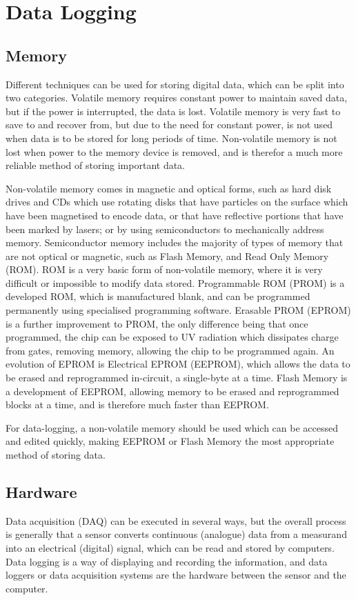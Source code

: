 \section{Data Logging}

\subsection{Memory}
Different techniques can be used for storing digital data, which can be split into two categories. Volatile memory requires constant power to maintain saved data, but if the power is interrupted, the data is lost. Volatile memory is very fast to save to and recover from, but due to the need for constant power, is not used when data is to be stored for long periods of time. Non-volatile memory is not lost when power to the memory device is removed, and is therefor a much more reliable method of storing important data. 

Non-volatile memory comes in magnetic and optical forms, such as hard disk drives and CDs which use rotating disks that have particles on the surface which have been magnetised to encode data, or that have reflective portions that have been marked by lasers; or by using semiconductors to mechanically address memory. Semiconductor memory includes the majority of types of memory that are not optical or magnetic, such as Flash Memory, and Read Only Memory (ROM). ROM is a very basic form of non-volatile memory, where it is very difficult or impossible to modify data stored. Programmable ROM (PROM) is a developed ROM, which is manufactured blank, and can be programmed permanently using specialised programming software. Erasable PROM (EPROM) is a further improvement to PROM, the only difference being that once programmed, the chip can be exposed to UV radiation which dissipates charge from gates, removing memory, allowing the chip to be programmed again. An evolution of EPROM is Electrical EPROM (EEPROM), which allows the data to be erased and reprogrammed in-circuit, a single-byte at a time. Flash Memory is a development of EEPROM, allowing memory to be erased and reprogrammed blocks at a time, and is therefore much faster than EEPROM.

For data-logging, a non-volatile memory should be used which can be accessed and edited quickly, making EEPROM or Flash Memory the most appropriate method of storing data. 

\subsection{Hardware}
Data acquisition (DAQ) can be executed in several ways, but the overall process is generally that a sensor converts continuous (analogue) data from a measurand into an electrical (digital) signal, which can be read and stored by computers. Data logging is a way of displaying and recording the information, and data loggers or data acquisition systems are the hardware between the sensor and the computer.

